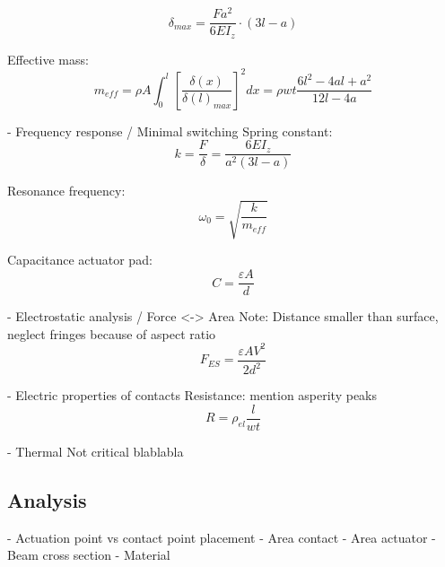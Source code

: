 \begin{equation}
	\delta_{max} = \frac{Fa^2}{6EI_z}\cdot(3l-a)
	\label{eq:beam_deflection}
\end{equation}

Effective mass:
\begin{equation}
	m_{eff} = \rho A \int_0^l{\left[\frac{\delta(x)}{\delta(l)_{max}}\right]^2dx} = \rho wt\frac{6l^2-4al+a^2}{12l-4a}
	\label{eq:effective_mass}
\end{equation}


- Frequency response / Minimal switching
Spring constant:
\begin{equation}
	k = \frac{F}{\delta} = \frac{6EI_z}{a^2(3l-a)}
	\label{eq:spring_constant}
\end{equation}

Resonance frequency:
\begin{equation}
	\omega_0 = \sqrt{\frac{k}{m_{eff}}}
	\label{eq:resonance_frequency}
\end{equation}

Capacitance actuator pad:
\begin{equation}
	C = \frac{\varepsilon A}{d}
	\label{eq:plate_capacitor}
\end{equation}

- Electrostatic analysis / Force <-> Area
Note: Distance smaller than surface, neglect fringes because of aspect ratio
\begin{equation}
	F_{ES} = \frac{\varepsilon AV^2}{2d^2}
	\label{eq:electrostatic_force}
\end{equation}

- Electric properties of contacts
Resistance:
mention asperity peaks
\begin{equation}
	R = \rho_{el}\frac{l}{wt}
	\label{eq:resistance}
\end{equation}

- Thermal
Not critical blablabla 

\subsection{Analysis}
\label{sec:analysis}
- Actuation point vs contact point placement
- Area contact
- Area actuator
- Beam cross section
- Material
